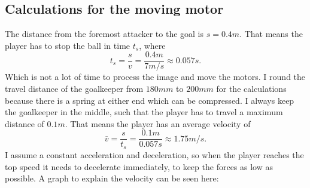 \subsection{Calculations for the moving motor}\label{subsec:moving_motor}
The distance from the foremost attacker to the goal is $s=0.4m$.
That means the player has to stop the ball in time $t_s$, where
\begin{equation}
    \label{eq:stopping_time}
    t_s = \frac{s}{v} = \frac{0.4m}{7m/s} \approx 0.057 s.
\end{equation}
Which is not a lot of time to process the image and move the motors.
I round the travel distance of the goalkeeper from $180mm$ to $200mm$ for the calculations because there is a spring at either end which can be compressed.
I always keep the goalkeeper in the middle, such that the player has to travel a maximum distance of $0.1m$.
That means the player has an average velocity of
\begin{equation}
    \label{eq:average_velocity}
    \bar{v} = \frac{s}{t_s} = \frac{0.1m}{0.057s} \approx 1.75m/s.
\end{equation}
I assume a constant acceleration and deceleration, so when the player reaches the top speed it needs to decelerate immediately, to keep the forces as low as possible.
A graph to explain the velocity can be seen here:

\begin{center}
\end{center}

